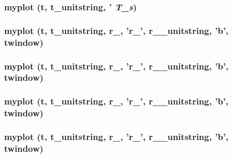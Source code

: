 \subsubsection[{myplot}]{\setlength{\rightskip}{0pt plus 5cm}myplot ({\bf t}, \/  {\bf t\_\-unitstring}, \/  ' {\em T\_\-s})}\label{matlab_2dataviewer_8m_a2169b7f827c869f8582b8a61117c43ab}
\subsubsection[{myplot}]{\setlength{\rightskip}{0pt plus 5cm}myplot ({\bf t}, \/  {\bf t\_\-unitstring}, \/  r\_, \/  'r\_', \/  {\bf r\_\_\-unitstring}, \/  'b', \/  {\bf twindow})}\label{matlab_2dataviewer_8m_aa645e49c7fe9015251b234d77df21043}
\subsubsection[{myplot}]{\setlength{\rightskip}{0pt plus 5cm}myplot ({\bf t}, \/  {\bf t\_\-unitstring}, \/  r\_, \/  'r\_', \/  {\bf r\_\_\-unitstring}, \/  'b', \/  {\bf twindow})}\label{matlab_2dataviewer_8m_a1d6ee2a6a49744e6e8521977ea923817}
\subsubsection[{myplot}]{\setlength{\rightskip}{0pt plus 5cm}myplot ({\bf t}, \/  {\bf t\_\-unitstring}, \/  r\_, \/  'r\_', \/  {\bf r\_\_\-unitstring}, \/  'b', \/  {\bf twindow})}\label{matlab_2dataviewer_8m_a4efe3ba482a14a5e2dbe55f28671530c}
\subsubsection[{myplot}]{\setlength{\rightskip}{0pt plus 5cm}myplot ({\bf t}, \/  {\bf t\_\-unitstring}, \/  r\_, \/  'r\_', \/  {\bf r\_\_\-unitstring}, \/  'b', \/  {\bf twindow})}\label{matlab_2dataviewer_8m_acf4f8261b70d04e7280aaaeaf9a252af}
